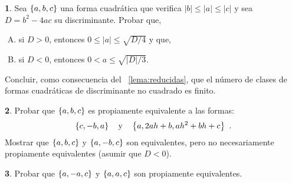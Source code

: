 \theoremstyle{definition}
\newtheorem{ejerReducidas}{\ejername}[section]



\begin{ejerReducidas}\label{ejer:reducidas:numero}
	Sea $\left\{a,b,c\right\}$ una forma cuadr\'atica que verifica
	$|b|\leq |a|\leq |c|$ y sea $D=b^2-4ac$ su discriminante.
	Probar que,%
	\begin{enumerate}[(A)]
		\item\label{ejer:reducidas:numero:indefinida}
			si $D>0$, entonces $0\leq |a|\leq\sqrt{D/4}$ y que,
		\item\label{ejer:reducidas:numer:definida}
			si $D<0$, entonces $0<a\leq\sqrt{|D|/3}$.
	\end{enumerate}
	Concluir, como consecuencia del \lemaname~\ref{lema:reducidas},
	que el n\'umero de clases de formas cuadr\'aticas de
	discriminante no cuadrado es finito.
\end{ejerReducidas}

\begin{ejerReducidas}\label{ejer:reducidas:equivalencia}
	Probar que $\left\{a,b,c\right\}$ es propiamente equivalente a
	las formas:
	\begin{displaymath}
		\left\{c,-b,a\right\}\quad\text{y}\quad\left\{a,2ah+b,ah^2+bh+c\right\}
		\text{ .}
	\end{displaymath}
	Mostrar que $\left\{a,b,c\right\}$ y $\left\{a,-b,c\right\}$ son
	equivalentes, pero no necesariamente propiamente equivalentes
	(asumir que $D<0$).
\end{ejerReducidas}

\begin{ejerReducidas}\label{ejer:reducidas:equivalencia:caso}
	Probar que $\left\{a,-a,c\right\}$ y $\left\{a,a,c\right\}$ son
	propiamente equivalentes.
\end{ejerReducidas}

